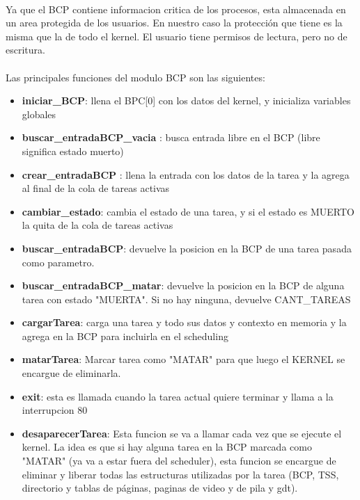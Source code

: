 \documentclass[11pt, a4paper]{article}
\begin{document}
\paragraph{}
Ya que el BCP contiene informacion critica de los procesos, esta almacenada en un area protegida de los usuarios. En nuestro caso la protección que tiene es la misma que la de todo el kernel. El usuario tiene permisos de lectura, pero no de escritura.

\paragraph{}
Las principales funciones del modulo BCP son las siguientes:

\begin{itemize}
\item \textbf{iniciar\_BCP}: llena el BPC[0] con los datos del kernel, y inicializa variables globales
\item \textbf{buscar\_entradaBCP\_vacia }: busca entrada libre en el BCP (libre significa estado muerto)
\item \textbf{crear\_entradaBCP }: llena la entrada con los datos de la tarea y la agrega al final de la cola de tareas activas
\item \textbf{cambiar\_estado}: cambia el estado de una tarea, y si el estado es MUERTO la quita de la cola de tareas activas
\item \textbf{buscar\_entradaBCP}: devuelve la posicion en la BCP de una tarea pasada como parametro.
\item \textbf{buscar\_entradaBCP\_matar}: devuelve la posicion en la BCP de alguna tarea con estado "MUERTA". Si no hay ninguna, devuelve CANT\_TAREAS
\item \textbf{cargarTarea}: carga una tarea y todo sus datos y contexto en memoria y la agrega en la BCP para incluirla en el scheduling
\item \textbf{matarTarea}: Marcar tarea como "MATAR" para que luego el KERNEL se encargue de eliminarla. 
\item \textbf{exit}:  esta es llamada cuando la tarea actual quiere terminar y llama a la interrupcion 80
\item \textbf{desaparecerTarea}: Esta funcion se va a llamar cada vez que se ejecute el kernel. La idea es que si hay alguna tarea en la BCP marcada como "MATAR" (ya va a estar fuera del scheduler), esta funcion se encargue de eliminar y liberar todas las estructuras utilizadas por la tarea (BCP, TSS, directorio y tablas de páginas, paginas de video y de pila y gdt).
\end{itemize}
\end{document}
